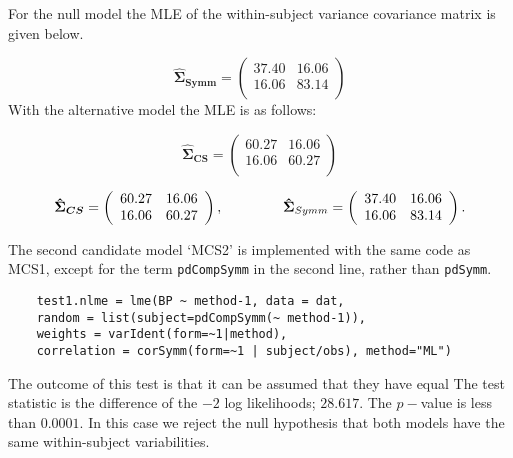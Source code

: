 \documentclass[12pt, a4paper]{report}
\theoremstyle{plain}
\theoremstyle{definition}
\theoremstyle{remark}
\begin{document}
For the null model the MLE of the within-subject variance covariance matrix is given below.

\begin{equation}
\boldsymbol{\hat{\Sigma}_{Symm}} = \left( \begin{array}{cc}
37.40 & 16.06  \\
16.06 & 83.14  \\
\end{array}\right)
\end{equation}
With the alternative model the MLE is as follows:

\begin{equation}
\boldsymbol{\hat{\Sigma}_{CS}} = \left( \begin{array}{cc}
60.27  & 16.06  \\
16.06  & 60.27  \\
\end{array}\right)
\end{equation}


\[
\boldsymbol{\hat{\Sigma}_{CS}} = \left( \begin{array}{cc}
60.27  & 16.06  \\
16.06  & 60.27  \\
\end{array}\right),
\hspace{1.5cm}
\boldsymbol{\hat{\Sigma}}_{Symm} = \left( \begin{array}{cc}
37.40 & 16.06  \\
16.06 & 83.14  \\
\end{array}\right).
\]

The second candidate model `MCS2' is implemented with the same code as MCS1, except for the term \texttt{pdCompSymm} in the second line, rather than \texttt{pdSymm}.

\begin{framed}
	\begin{verbatim}
	test1.nlme = lme(BP ~ method-1, data = dat,
	random = list(subject=pdCompSymm(~ method-1)),
	weights = varIdent(form=~1|method),
	correlation = corSymm(form=~1 | subject/obs), method="ML")
	\end{verbatim}
\end{framed}

The outcome of this test is that it can be assumed that they have equal
The test statistic is the difference of the $-2$ log likelihoods; $28.617$. The $p-$value is less than $0.0001$. In this case we reject the null hypothesis that both models have the same within-subject variabilities.
\end{document}
